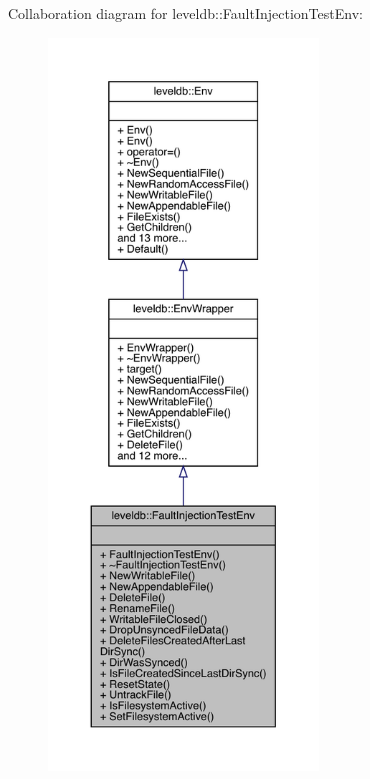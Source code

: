 Collaboration diagram for leveldb\+::Fault\+Injection\+Test\+Env\+:
\nopagebreak
\begin{figure}[H]
\begin{center}
\leavevmode
\includegraphics[height=550pt]{classleveldb_1_1_fault_injection_test_env__coll__graph}
\end{center}
\end{figure}
